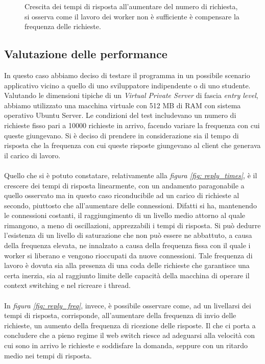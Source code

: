 \documentclass[italian]{tktltiki2}
\begin{document}
\begin{figure}[H]
\caption{Crescita dei tempi di risposta all'aumentare del numero di richiesta, si osserva come il lavoro dei worker non è sufficiente è compensare la frequenza delle richieste. \label{fig: cfr_reply_time2}}
\end{figure}
\subsection{Valutazione delle performance}
In questo caso abbiamo deciso di testare il programma in un possibile scenario applicativo vicino a quello di uno sviluppatore indipendente o di uno studente. Valutando le dimensioni tipiche di un \emph{Virtual Private Server} di fascia \emph{entry level}, abbiamo utilizzato una macchina virtuale con 512 MB di RAM con sistema operativo Ubuntu Server. Le condizioni del test includevano un numero di richieste fisso pari a 10000 richieste in arrivo, facendo variare la frequenza con cui queste giungevano. Si è deciso di prendere in considerazione sia il tempo di risposta che la frequenza con cui queste risposte giungevano al client che generava il carico di lavoro. \\\\ 
Quello che si è potuto constatare, relativamente alla \emph{figura \ref{fig: reply_times}}, è il crescere dei tempi di risposta linearmente, con un andamento paragonabile a quello osservato ma in questo caso riconducibile ad un carico di richieste al secondo, piuttosto che all'aumentare delle connessioni. Difatti si ha, mantenendo le connessioni costanti, il raggiungimento di un livello medio attorno al quale rimangono, a meno di oscillazioni, apprezzabili i tempi di risposta. Si può dedurre l'esistenza di un livello di saturazione che non può essere ne abbattuto, a causa della frequenza elevata, ne innalzato a causa della frequenza fissa con il quale i worker si liberano e vengono rioccupati da nuove connessioni. Tale frequenza di lavoro è dovuta sia alla presenza di una coda delle richieste che garantisce una certa inerzia, sia al raggiunto limite delle capacità della macchina di operare il context switching e nel ricreare i thread. \\\\
In \emph{figura \ref{fig: reply_freq}}, invece, è possibile osservare come, ad un livellarsi dei tempi di risposta, corrisponde, all'aumentare della frequenza di invio delle richieste, un aumento della frequenza di ricezione delle risposte. Il che ci porta a concludere che a pieno regime il web switch riesce ad adeguarsi alla velocità con cui sono in arrivo le richieste e soddisfare la domanda, seppure con un ritardo medio nei tempi di risposta.
\end{document}
